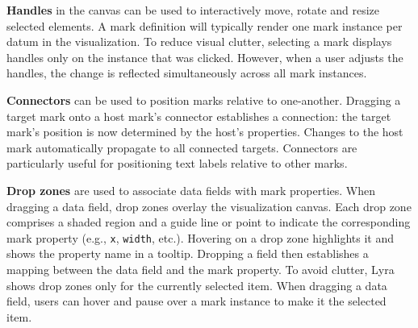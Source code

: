 
\vspace{5pt}
\noindent
\textbf{Handles} in the canvas can be used to interactively move, rotate and
resize selected elements. A mark definition will typically render one mark
instance per datum in the visualization. To reduce visual clutter, selecting a
mark displays handles only on the instance that was clicked. However, when a
user adjusts the handles, the change is reflected simultaneously across all mark
instances.


\vspace{5pt}
\noindent
\textbf{Connectors} can be used to position marks relative to one-another.
Dragging a target mark onto a host mark's connector establishes a connection:
the target mark's position is now determined by the host's properties. Changes
to the host mark automatically propagate to all connected targets. Connectors
are particularly useful for positioning text labels relative to other marks.


\vspace{5pt}
\noindent
\textbf{Drop zones} are used to associate data fields with mark properties. When
dragging a data field, drop zones overlay the visualization canvas. Each drop
zone comprises a shaded region and a guide line or point to indicate the
corresponding mark property (e.g., \texttt{x}, \texttt{width}, etc.). Hovering
on a drop zone highlights it and shows the property name in a tooltip. Dropping
a field then establishes a mapping between the data field and the mark property.
To avoid clutter, Lyra shows drop zones only for the currently selected item.
When dragging a data field, users can hover and pause over a mark instance to
make it the selected item.

